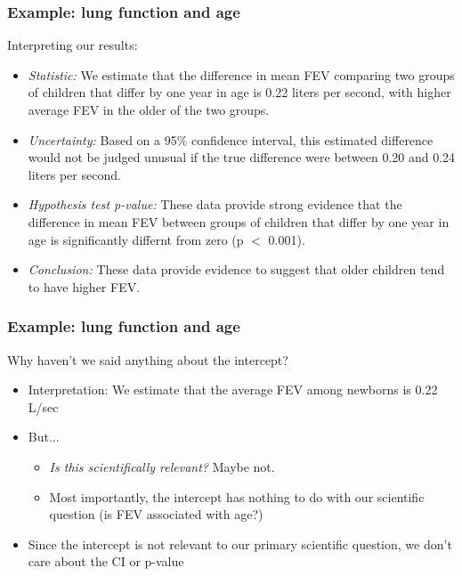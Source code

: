 \documentclass[12pt, 
hyperref={colorlinks=true, linkcolor=blue, urlcolor=cyan}]{beamer}
\begin{document}
\begin{frame}
\frametitle{Example: lung function and age}
Interpreting our results:\vspace{-0.3cm}
\begin{itemize}
\item \textit{Statistic:} We estimate that the difference in mean FEV comparing two groups of children that differ by one year in age is 0.22 liters per second, with higher average FEV in the older of the two groups. \pause
\item \textit{Uncertainty:} Based on a 95\% confidence interval, this estimated difference would not be judged unusual if the true difference were between 0.20 and 0.24 liters per second.\pause
\item \textit{Hypothesis test p-value:} These data provide strong evidence that the difference in mean FEV between groups of children that differ by one year in age is significantly differnt from zero (p $<$ 0.001). \pause
\item \textit{Conclusion:} These data provide evidence to suggest that older children tend to have higher FEV. 
\end{itemize}
\end{frame}

\begin{frame}
\frametitle{Example: lung function and age}
Why haven't we said anything about the intercept? \vspace{-0.3cm}
\begin{itemize}
\item Interpretation: We estimate that the average FEV among newborns is 0.22 L/sec \pause
\item But... 
	\begin{itemize}
	\item \textit{Is this scientifically relevant?} Maybe not.
	\item Most importantly, \color{blue} the intercept has nothing to do with our scientific question \color{black} (is FEV associated with age?) \pause
	\end{itemize}
\item Since the intercept is not relevant to our primary scientific question, we don't care about the CI or p-value
\end{itemize}
\end{frame}


\end{document}

